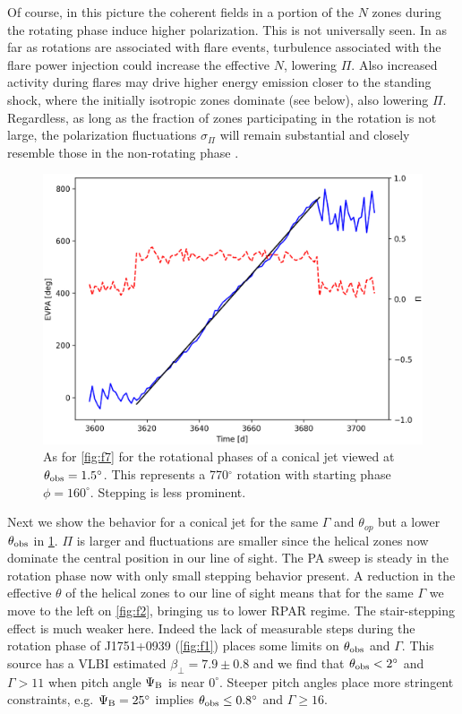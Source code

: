 Of course, in this picture the coherent fields in a portion of the $N$ zones during the rotating phase induce higher polarization. This is not universally seen. In as far as rotations are associated with flare events, turbulence associated with the flare power injection could increase the effective $N$, lowering $\Pi$. Also increased activity during flares may drive higher energy emission closer to the standing shock, where the initially isotropic zones dominate (see below), also lowering $\Pi$. Regardless, as long as the fraction of zones participating in the rotation is not large, the polarization fluctuations $\sigma_\Pi$ will remain substantial and closely resemble those in the non-rotating phase \citep{blinov_robopol_2016}.

\begin{figure}[t]
\label{fig:f8}
\includegraphics[width=0.8\linewidth]{figures/f8.eps}
\centering
\caption{As for \cref{fig:f7} for the rotational phases of a conical jet viewed at $\theta_{\rm obs} = 1.5^{\circ}$. This represents a 770$^{\circ}$ rotation with starting phase $\phi=160^{\circ}$. Stepping is less prominent.}
\end{figure}

Next we show the behavior for a conical jet for the same $\Gamma$ and $\theta_{op}$ but a lower $\theta_{\rm obs}$ in \cref{fig:f8}. $\Pi$ is larger and fluctuations are smaller since the helical zones now dominate the central position in our line of sight. The PA sweep is steady in the rotation phase now with only small stepping behavior present. A reduction in the effective $\theta$ of the helical zones to our line of sight means that for the same $\Gamma$ we move to the left on \cref{fig:f2}, bringing us to lower RPAR regime. The stair-stepping effect is much weaker here. Indeed the lack of measurable steps during the rotation phase of J1751+0939 (\cref{fig:f1}) places some limits on $\theta_{\rm obs}$ and $\Gamma$. This source has a VLBI estimated $\beta_\perp = 7.9\pm 0.8$ \citep{lister_mojave_2013} and we find that $\theta_{\rm obs} < 2^{\circ}$ and $\Gamma > 11$ when pitch angle $\Psi_{\rm B}$ is near $0^{\circ}$. Steeper pitch angles place more stringent constraints, e.g. $\Psi_{\rm B} = 25^{\circ}$ implies $\theta_{\rm obs} \leq 0.8^{\circ}$ and $\Gamma \geq 16$.
    
